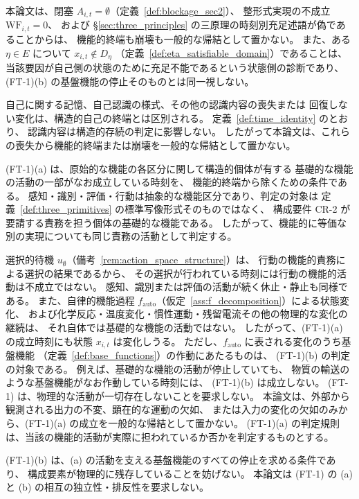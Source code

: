 \begin{remark}
本論文は、閉塞 $A_{i,t}=\emptyset$（定義~\ref{def:blockage_sec2}）、
整形式実現の不成立 $\mathrm{WF}_{i,t}=0$、
および \S\ref{sec:three_principles} の三原理の時刻別充足述語が偽であることからは、
機能的終端も崩壊も一般的な帰結として置かない。
また、ある $\eta\in E$ について $x_{i,t}\notin D_\eta$
（定義~\ref{def:eta_satisfiable_domain}）であることは、
当該要因が自己側の状態のために充足不能であるという状態側の診断であり、
(FT-1)(b) の基盤機能の停止そのものとは同一視しない。

自己に関する記憶、自己認識の様式、その他の認識内容の喪失または
回復しない変化は、構造的自己の終端とは区別される。
定義~\ref{def:time_identity} のとおり、
認識内容は構造的存続の判定に影響しない。
したがって本論文は、これらの喪失から機能的終端または崩壊を一般的な帰結として置かない。
\end{remark}

\begin{remark}
\label{rem:primitive_activity_cessation}
(FT-1)(a) は、原始的な機能の各区分に関して構造的個体が有する
基礎的な機能の活動の一部がなお成立している時刻を、
機能的終端から除くための条件である。
感知・識別・評価・行動は抽象的な機能区分であり、判定の対象は
定義~\ref{def:three_primitives} の標準写像形式そのものではなく、
構成要件 CR-2 が要請する責務を担う個体の基礎的な機能である。
したがって、機能的に等価な別の実現についても同じ責務の活動として判定する。

選択的待機 $u_{\emptyset}$（備考~\ref{rem:action_space_structure}）は、
行動の機能的責務による選択の結果であるから、
その選択が行われている時刻には行動の機能的活動は不成立ではない。
感知、識別または評価の活動が続く休止・静止も同様である。
また、自律的機能過程 $f_{\mathrm{auto}}$（仮定~\ref{ass:f_decomposition}）による状態変化、
および化学反応・温度変化・慣性運動・残留電流その他の物理的な変化の継続は、
それ自体では基礎的な機能の活動ではない。
したがって、(FT-1)(a) の成立時刻にも状態 $x_{i,t}$ は変化しうる。
ただし、$f_{\mathrm{auto}}$ に表される変化のうち基盤機能
（定義~\ref{def:base_functions}）の作動にあたるものは、
(FT-1)(b) の判定の対象である。
例えば、基礎的な機能の活動が停止していても、
物質の輸送のような基盤機能がなお作動している時刻には、
(FT-1)(b) は成立しない。
(FT-1) は、物理的な活動が一切存在しないことを要求しない。
本論文は、外部から観測される出力の不変、顕在的な運動の欠如、
または入力の変化の欠如のみから、(FT-1)(a) の成立を一般的な帰結として置かない。
(FT-1)(a) の判定規則は、当該の機能的活動が実際に担われているか否かを判定するものとする。

(FT-1)(b) は、(a) の活動を支える基盤機能のすべての停止を求める条件であり、
構成要素が物理的に残存していることを妨げない。
本論文は (FT-1) の (a) と (b) の相互の独立性・排反性を要求しない。
\end{remark}

